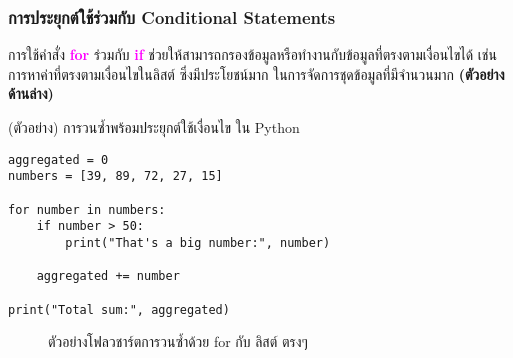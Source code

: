 \documentclass[12pt,a4paper]{article}
\newcommand{\textlight}[1]{{\thailightfont #1}}
\begin{document}
\subsubsection{การประยุกต์ใช้ร่วมกับ Conditional Statements}

\textlight{การใช้คำสั่ง \textbf{\textcolor{magenta}{for}} ร่วมกับ \textbf{\textcolor{magenta}{if}} ช่วยให้สามารถกรองข้อมูลหรือทำงานกับข้อมูลที่ตรงตามเงื่อนไขได้ เช่น การหาค่าที่ตรงตามเงื่อนไขในลิสต์ ซึ่งมีประโยชน์มาก ในการจัดการชุดข้อมูลที่มีจำนวนมาก \textbf{(ตัวอย่างด้านล่าง)}}

\begin{codebox}{(ตัวอย่าง) การวนซ้ำพร้อมประยุกต์ใช้เงื่อนไข ใน Python}
\begin{lstlisting}[style=python]
aggregated = 0
numbers = [39, 89, 72, 27, 15]

for number in numbers:
    if number > 50:
        print("That's a big number:", number)

    aggregated += number

print("Total sum:", aggregated)
\end{lstlisting}
\end{codebox}

\begin{figure}[H]
\centering
{}
\caption{ตัวอย่างโฟลวชาร์ตการวนซ้ำด้วย for กับ ลิสต์ ตรงๆ}
\end{figure}
\end{document}
